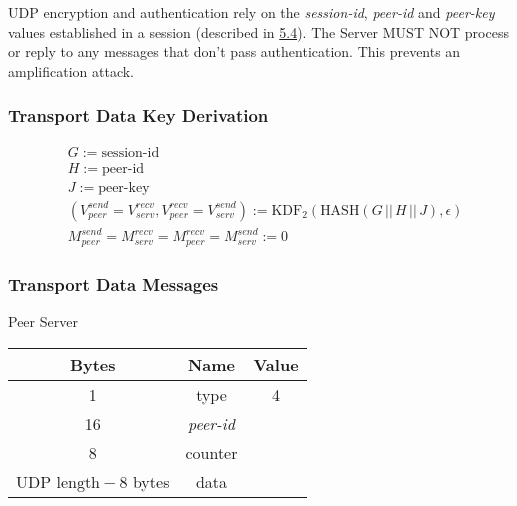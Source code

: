 \documentclass{article}
\begin{document}
    UDP encryption and authentication rely on the \emph{session-id}, \emph{peer-id} and \emph{peer-key} values
    established in a session
    (described in \hyperlink{subsection.5.4}{5.4}). The Server MUST NOT
    process or reply to any messages that don't pass authentication. This prevents an amplification attack.\\

    \subsubsection{Transport Data Key Derivation}

    \begin{align*}
        &  G:= \text{session-id}                                                               \\
        &  H := \text{peer-id}                                                                \\
        &  J := \text{peer-key}                                                              \\
        &  (V_{peer}^{send} = V_{serv}^{recv}, V_{peer}^{recv} = V_{serv}^{send}) := \text{KDF}_2(\text{HASH}(G\,
        ||\, H\,||\, J), \epsilon)                                        \\
        &   M_{peer}^{send} = M_{serv}^{recv} = M_{peer}^{recv} = M_{serv}^{send} := 0
    \end{align*}

    \subsubsection{Transport Data Messages}

    \begin{center}
        Peer \textrightarrow Server\\
        \begin{tabular}{|c|c|c|}
            \hline
            \textbf{Bytes}                & \textbf{Name}  & \textbf{Value} \\
            \hline
            1                             & type           & 4              \\
            \hline
            16                            & \emph{peer-id} &                \\
            \hline
            8                             & counter        &                \\
            \hline
            $\text{UDP length} - 8$ bytes & data           &                \\
            \hline
        \end{tabular}
    \end{center}
\end{document}
